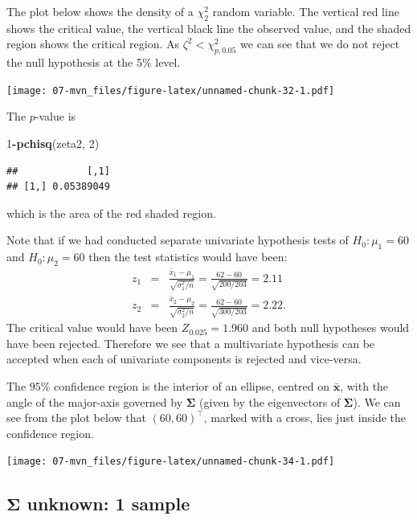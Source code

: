 \documentclass[]{book}
\newenvironment{Shaded}{\begin{snugshade}}{\end{snugshade}}
\newcommand{\DecValTok}[1]{\textcolor[rgb]{0.00,0.00,0.81}{#1}}
\newcommand{\KeywordTok}[1]{\textcolor[rgb]{0.13,0.29,0.53}{\textbf{#1}}}
\newcommand{\NormalTok}[1]{#1}
\newcommand{\OperatorTok}[1]{\textcolor[rgb]{0.81,0.36,0.00}{\textbf{#1}}}
\theoremstyle{definition}
\theoremstyle{definition}
\theoremstyle{definition}
\theoremstyle{remark}
\begin{document}
The plot below shows the density of a \(\chi^2_2\) random variable. The vertical red line shows the critical value, the vertical black line the observed value, and the shaded region shows the critical region. As \(\zeta^2 < \chi^2_{p,0.05}\) we can see that we do not reject the null hypothesis at the 5\% level.

\texttt{[image: 07-mvn\_files/figure-latex/unnamed-chunk-32-1.pdf]}

The \(p\)-value is

\begin{Shaded}
\begin{Highlighting}[]
\DecValTok{1}\OperatorTok{-}\KeywordTok{pchisq}\NormalTok{(zeta2, }\DecValTok{2}\NormalTok{)}
\end{Highlighting}
\end{Shaded}

\begin{verbatim}
##            [,1]
## [1,] 0.05389049
\end{verbatim}

which is the area of the red shaded region.

Note that if we had conducted separate univariate hypothesis tests of \(H_0: \mu_1 = 60\) and \(H_0: \mu_2 = 60\) then the test statistics would have been:
\begin{eqnarray*}
z_1 &=& \frac{\bar{x}_1 - \mu_1}{\sqrt{\sigma_1^2/n}} = \frac{62-60}{\sqrt{200/203}} = 2.11  \\
z_2 &=& \frac{\bar{x}_2 - \mu_2}{\sqrt{\sigma_2^2/n}} = \frac{62-60}{\sqrt{300/203}} = 2.22.
\end{eqnarray*}
The critical value would have been \(Z_{0.025} = 1.960\) and both null hypotheses would have been rejected. Therefore we see that a multivariate hypothesis can be accepted when each of univariate components is rejected and vice-versa.

The \(95\)\% confidence region is the interior of an ellipse, centred on \(\bar{\mathbf x}\), with the angle of the major-axis governed by \(\boldsymbol{\Sigma}\) (given by the eigenvectors of \(\boldsymbol{\Sigma}\)). We can see from the plot below that \((60,60)^\top\), marked with a cross, lies just inside the confidence region.

\texttt{[image: 07-mvn\_files/figure-latex/unnamed-chunk-34-1.pdf]}

\hypertarget{onesample}{%
\subsection{\texorpdfstring{\(\boldsymbol{\Sigma}\) unknown: 1 sample}{\textbackslash{}boldsymbol\{\textbackslash{}Sigma\} unknown: 1 sample}}\label{onesample}}
\end{document}
